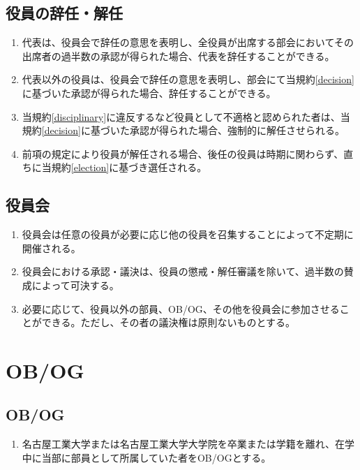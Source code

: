 \documentclass[12pt, unicode, a4paper]{ltjsreport}
\begin{document}
    \section{役員の辞任・解任}\label{resignation}
        \begin{enumerate}
            \item 代表は、役員会で辞任の意思を表明し、全役員が出席する部会においてその出席者の過半数の承認が得られた場合、代表を辞任することができる。
            \item 代表以外の役員は、役員会で辞任の意思を表明し、部会にて当規約\ref{decision}に基づいた承認が得られた場合、辞任することができる。
            \item 当規約\ref{disciplinary}に違反するなど役員として不適格と認められた者は、当規約\ref{decision}に基づいた承認が得られた場合、強制的に解任させられる。
            \item 前項の規定により役員が解任される場合、後任の役員は時期に関わらず、直ちに当規約\ref{election}に基づき選任される。
        \end{enumerate}

    \section{役員会}\label{directors-meeting}
        \begin{enumerate}
            \item 役員会は任意の役員が必要に応じ他の役員を召集することによって不定期に開催される。
            \item 役員会における承認・議決は、役員の懲戒・解任審議を除いて、過半数の賛成によって可決する。
            \item 必要に応じて、役員以外の部員、OB/OG、その他を役員会に参加させることができる。ただし、その者の議決権は原則ないものとする。
        \end{enumerate}


\chapter{OB/OG}
    \section{OB/OG}
        \begin{enumerate}
            \item 名古屋工業大学または名古屋工業大学大学院を卒業または学籍を離れ、在学中に当部に部員として所属していた者をOB/OGとする。
        \end{enumerate}
\end{document}
